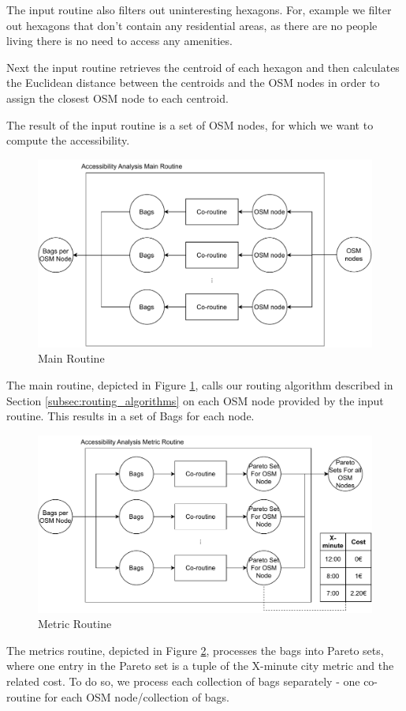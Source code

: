 The input routine also filters out uninteresting hexagons.
For, example we filter out hexagons that don't contain any residential areas, as there are no people living there is no need to access any amenities.

Next the input routine retrieves the centroid of each hexagon and then calculates the Euclidean distance between the centroids and the OSM nodes in order to assign the closest OSM node to each centroid.

The result of the input routine is a set of OSM nodes, for which we want to compute the accessibility.



\begin{figure}
    \centering
    \includegraphics[scale=0.75]{Figures/method/main_routine}
    \caption{Main Routine}
    \label{fig:main_routine}
\end{figure}
The main routine, depicted in Figure \ref{fig:main_routine}, calls our routing algorithm described in Section \ref{subsec:routing_algorithms} on each OSM node provided by the input routine.
This results in a set of Bags for each node.

\begin{figure}
    \centering
    \includegraphics[scale=0.75]{Figures/method/metric_routine}
    \caption{Metric Routine}
    \label{fig:metric_routine}
\end{figure}
The metrics routine, depicted in Figure \ref{fig:metric_routine}, processes the bags into Pareto sets, where one entry in the Pareto set is a tuple of the X-minute city metric and the related cost.
To do so, we process each collection of bags separately - one co-routine for each OSM node/collection of bags.

